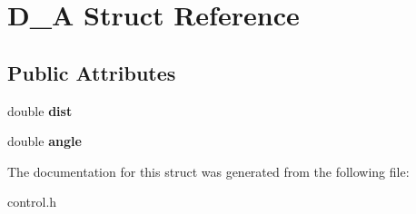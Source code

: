 \hypertarget{structD__A}{}\section{D\+\_\+A Struct Reference}
\label{structD__A}
\subsection*{Public Attributes}
\begin{DoxyCompactItemize}
\item 
\mbox{\label{structD__A_a0adcbf6ddc78650737322a9f5cc1fa06}} 
double {\bfseries dist}
\item 
\mbox{\label{structD__A_a5dfb99bfdf59de1d782e725b1385dc52}} 
double {\bfseries angle}
\end{DoxyCompactItemize}


The documentation for this struct was generated from the following file\+:\begin{DoxyCompactItemize}
\item 
control.\+h\end{DoxyCompactItemize}

